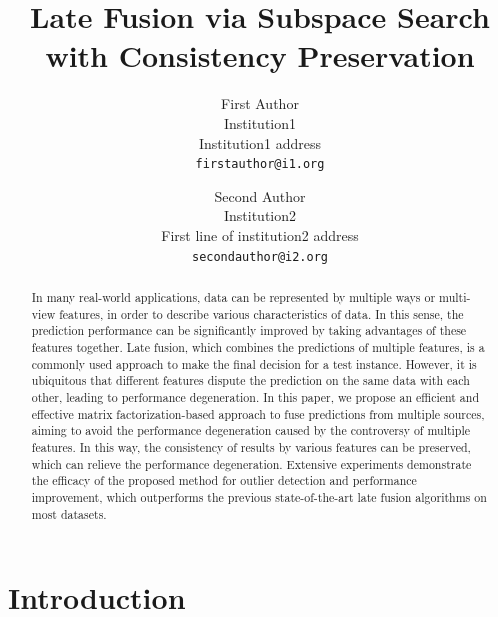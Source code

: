 \documentclass[10pt,twocolumn,letterpaper]{article}
\begin{document}
\title{Late Fusion via Subspace Search with Consistency Preservation}

\author{First Author\\
Institution1\\
Institution1 address\\
{\tt\small firstauthor@i1.org}
\and
Second Author\\
Institution2\\
First line of institution2 address\\
{\tt\small secondauthor@i2.org}
}

\maketitle


\begin{abstract}
In many real-world applications, data can be represented by multiple ways or multi-view features, in order to describe various characteristics of data. In this sense, the prediction performance can be significantly improved by taking advantages of these features together. Late fusion, which combines the predictions of multiple features, is a commonly used approach to make the final decision for a test instance. However, it is ubiquitous that different features dispute the prediction on the same data with each other, leading to performance degeneration. In this paper, we propose an efficient and effective matrix factorization-based approach to fuse predictions from multiple sources, aiming to avoid the performance degeneration caused by the controversy of multiple features. In this way, the consistency of results by various features can be preserved, which can relieve the performance degeneration. Extensive experiments demonstrate the efficacy of the proposed method for outlier detection and performance improvement, which outperforms the previous state-of-the-art late fusion algorithms on most datasets.
\end{abstract}

\section{Introduction}
\end{document}
